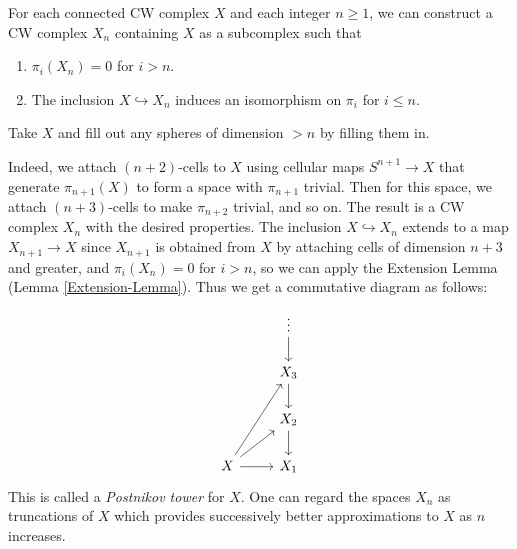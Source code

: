\begin{example}\label{Postnikov-Towers}
    For each connected CW complex $X$ and each
    integer $n\ge 1$, we can construct a 
    CW complex $X_n$ containing $X$ as a subcomplex such that
    \begin{enumerate}
        \item $\pi_i \left( X_n \right) = 0$ for $i>n$.
        \item The inclusion $X \hookrightarrow X_n$ induces
            an isomorphism on $\pi_i$ for $i\le n$.
    \end{enumerate}
    
    \begin{idea}
        Take $X$ and fill out any spheres of dimension
        $>n$ by filling them in.
    \end{idea}
    Indeed, we attach $(n+2)$-cells to
    $X$ using cellular maps $S^{n+1} \to X$ that
    generate $\pi_{n+1}(X)$ to form a 
    space with $\pi_{n+1}$ trivial. Then
    for this space, we attach $(n+3)$-cells to
    make $\pi_{n+2}$ trivial, and so on. The result
    is a CW complex $X_n$ with the desired properties.
    The inclusion $X \hookrightarrow X_n$ extends
    to a map $X_{n+1} \to X$ since
    $X_{n+1}$ is obtained from $X$ by attaching cells
    of dimension $n+3$ and greater, and
    $\pi_i (X_n) = 0$ for $i>n$, so we
    can apply the Extension Lemma (Lemma \ref{Extension-Lemma}).
    Thus we get a commutative diagram as follows:
    \begin{equation*}
    \begin{tikzcd}
        & \vdots \ar[d] \\
        & X_3 \ar[d] \\
        & X_2 \ar[d] \\
        X \ar[r] \ar[ru] \ar[ruu] & X_1
    \end{tikzcd}
    \end{equation*}
    This is called a \textit{Postnikov tower} for $X$.
    One can regard the spaces $X_n$ as truncations of
    $X$ which provides successively better approximations
    to $X$ as $n$ increases.
    


\end{example}
